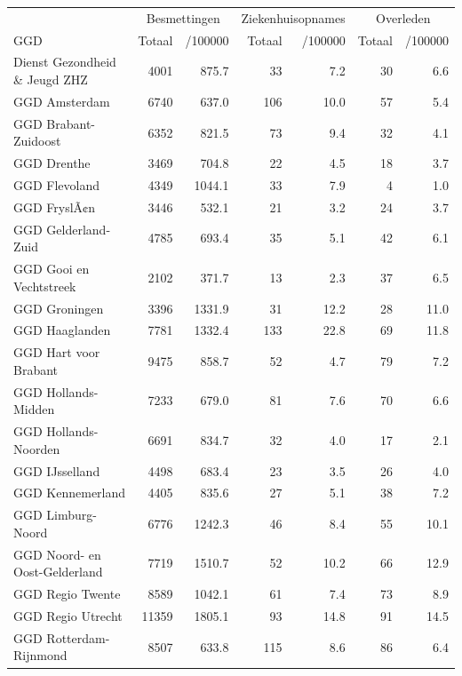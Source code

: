 \documentclass[
  english,
  man,floatsintext]{apa6}
\begin{document}
\begin{table}[H]
\centering\begingroup\fontsize{10}{12}\selectfont

\begin{threeparttable}
\begin{tabular}{lrrrrrr}
\toprule
\multicolumn{1}{c}{ } & \multicolumn{2}{c}{Besmettingen} & \multicolumn{2}{c}{Ziekenhuisopnames} & \multicolumn{2}{c}{Overleden} \\
\cmidrule(l{3pt}r{3pt}){2-3} \cmidrule(l{3pt}r{3pt}){4-5} \cmidrule(l{3pt}r{3pt}){6-7}
GGD & Totaal & /100000 & Totaal & /100000 & Totaal & /100000\\
\midrule
Dienst Gezondheid \& Jeugd ZHZ & 4001 & 875.7 & 33 & 7.2 & 30 & 6.6\\
GGD Amsterdam & 6740 & 637.0 & 106 & 10.0 & 57 & 5.4\\
GGD Brabant-Zuidoost & 6352 & 821.5 & 73 & 9.4 & 32 & 4.1\\
GGD Drenthe & 3469 & 704.8 & 22 & 4.5 & 18 & 3.7\\
GGD Flevoland & 4349 & 1044.1 & 33 & 7.9 & 4 & 1.0\\
GGD FryslÃ¢n & 3446 & 532.1 & 21 & 3.2 & 24 & 3.7\\
GGD Gelderland-Zuid & 4785 & 693.4 & 35 & 5.1 & 42 & 6.1\\
GGD Gooi en Vechtstreek & 2102 & 371.7 & 13 & 2.3 & 37 & 6.5\\
GGD Groningen & 3396 & 1331.9 & 31 & 12.2 & 28 & 11.0\\
GGD Haaglanden & 7781 & 1332.4 & 133 & 22.8 & 69 & 11.8\\
GGD Hart voor Brabant & 9475 & 858.7 & 52 & 4.7 & 79 & 7.2\\
GGD Hollands-Midden & 7233 & 679.0 & 81 & 7.6 & 70 & 6.6\\
GGD Hollands-Noorden & 6691 & 834.7 & 32 & 4.0 & 17 & 2.1\\
GGD IJsselland & 4498 & 683.4 & 23 & 3.5 & 26 & 4.0\\
GGD Kennemerland & 4405 & 835.6 & 27 & 5.1 & 38 & 7.2\\
GGD Limburg-Noord & 6776 & 1242.3 & 46 & 8.4 & 55 & 10.1\\
GGD Noord- en Oost-Gelderland & 7719 & 1510.7 & 52 & 10.2 & 66 & 12.9\\
GGD Regio Twente & 8589 & 1042.1 & 61 & 7.4 & 73 & 8.9\\
GGD Regio Utrecht & 11359 & 1805.1 & 93 & 14.8 & 91 & 14.5\\
GGD Rotterdam-Rijnmond & 8507 & 633.8 & 115 & 8.6 & 86 & 6.4\\

\end{tabular}
\end{threeparttable}
\end{table}
\end{document}
